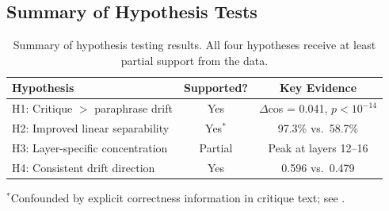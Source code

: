 \subsection{Summary of Hypothesis Tests}

\begin{table}[t]
    \centering
    \caption{Summary of hypothesis testing results. All four hypotheses receive at least partial support from the data.}
    \begin{tabular}{@{}p{5.5cm}cc@{}}
        \toprule
        Hypothesis & Supported? & Key Evidence \\
        \midrule
        H1: Critique $>$ paraphrase drift & Yes & $\Delta$cos = 0.041, $p < 10^{-14}$ \\
        H2: Improved linear separability & Yes$^*$ & 97.3\% vs.\ 58.7\% \\
        H3: Layer-specific concentration & Partial & Peak at layers 12--16 \\
        H4: Consistent drift direction & Yes & 0.596 vs.\ 0.479 \\
        \bottomrule
    \end{tabular}
    \begin{flushleft}
    {\scriptsize $^*$Confounded by explicit correctness information in critique text; see .}
    \end{flushleft}
    \label{tab:hypotheses}
\end{table}
